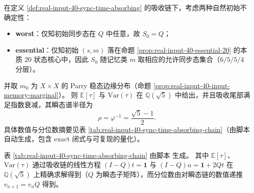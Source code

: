 \begin{proposition}\label{prop:real-input-40-sync-time-moments}
在定义 \ref{def:real-input-40-sync-time-absorbing} 的吸收链下，考虑两种自然初始不确定性：
\begin{itemize}
  \item \textbf{worst}：仅知初始同步态在 \(Q\) 中任意，故 \(S_0=Q\)；
  \item \textbf{essential}：仅知初始 $(s,m)$ 落在命题 \ref{prop:real-input-40-essential-20} 的本质 $20$ 状态核心中，因此 \(S_0\) 随记忆类 \(m\) 取相应的允许同步态集合（$6/5/5/4$ 分层）。
\end{itemize}
并取 \(m_0\) 为 \(X\times X\) 的 Parry 稳态边缘分布（命题 \ref{prop:real-input-40-input-memory-marginal}）。
则 \(\mathbb{E}[\tau]\) 与 \(\mathrm{Var}(\tau)\) 在 \(\mathbb{Q}(\sqrt5)\) 中给出，并且吸收尾部满足指数衰减，其瞬态谱半径为
\[
\rho=\varphi^{-1}=\frac{\sqrt5-1}{2}.
\]
具体数值与分位数摘要见表 \ref{tab:real-input-40-sync-time-absorbing-chain}（由脚本自动生成，包含 exact 闭式与可复现的量化）。
\end{proposition}



\begin{remark}[可复现输出与计算口径]\label{rem:real-input-40-sync-time-repro}
表 \ref{tab:real-input-40-sync-time-absorbing-chain} 由脚本  生成。
其中 \(\mathbb{E}[\tau]\)、\(\mathrm{Var}(\tau)\) 通过吸收链的线性方程
\(
(I-Q)t=\mathbf{1}
\)
与
\(
(I-Q)u=\mathbf{1}+2Qt
\)
在 \(\mathbb{Q}(\sqrt5)\) 上精确求解得到（\(Q\) 为瞬态子矩阵），而分位数由对瞬态链的数值递推 \(v_{n+1}=v_n Q\) 得到。
\end{remark}
